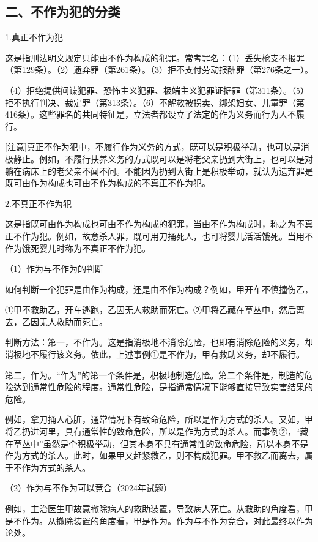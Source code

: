 \subsection*{二、不作为犯的分类}

1.真正不作为犯

这是指刑法明文规定只能由不作为构成的犯罪。常考罪名：（1）丢失枪支不报罪（第129条）。（2）遗弃罪（第261条）。（3）拒不支付劳动报酬罪（第276条之一）。

（4）拒绝提供间谍犯罪、恐怖主义犯罪、极端主义犯罪证据罪（第311条）。（5）拒不执行判决、裁定罪（第313条）。（6）不解救被拐卖、绑架妇女、儿童罪（第416条）。这些罪名的共同特征是，立法者都设立了法定的作为义务而行为人不履行。

[注意]真正不作为犯中，不履行作为义务的方式，既可以是积极举动，也可以是消极静止。例如，不履行扶养义务的方式既可以是将老父亲扔到大街上，也可以是对躺在病床上的老父亲不闻不问。不能因为扔到大街上是积极举动，就认为遗弃罪是既可由作为构成也可由不作为构成的不真正不作为犯。

2.不真正不作为犯

这是指既可由作为构成也可由不作为构成的犯罪，当由不作为构成时，称之为不真正不作为犯。例如，故意杀人罪，既可用刀捅死人，也可将婴儿活活饿死。当用不作为饿死婴儿时称为不真正不作为犯。

（1）作为与不作为的判断

如何判断一个犯罪是由作为构成，还是由不作为构成？例如，甲开车不慎撞伤乙，

①甲不救助乙，开车逃跑，乙因无人救助而死亡。②甲将乙藏在草丛中，然后离去，乙因无人救助而死亡。

判断方法：第一，不作为。这是指消极地不消除危险，也即有消除危险的义务，却消极地不履行该义务。依此，上述事例①是不作为，甲有救助义务，却不履行。

第二，作为。“作为”的第一个条件是，积极地制造危险。第二个条件是，制造的危险达到通常性危险的程度。通常性危险，是指通常情况下能够直接导致实害结果的危险。

例如，拿刀捅人心脏，通常情况下有致命危险，所以是作为方式的杀人。又如，甲将乙扔进河里，具有通常性的致命危险，所以是作为方式的杀人。而事例②，“藏在草丛中”虽然是个积极举动，但其本身不具有通常性的致命危险，所以本身不是作为方式的杀人。此时，如果甲又赶紧救乙，则不构成犯罪。甲不救乙而离去，属于不作为方式的杀人。

（2）作为与不作为可以竞合（2024年试题）

例如，主治医生甲故意撤除病人的救助装置，导致病人死亡。从救助的角度看，甲是不作为。从撤除装置的角度看，甲是作为。作为与不作为竞合，对此最终以作为论处。

